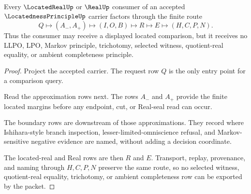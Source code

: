 \begin{theorem}
\label{thm:locatedness-principle-real-boundary}
Every $\LocatedRealUp$ or $\RealUp$ consumer of an accepted $\LocatednessPrincipleUp$ carrier factors through the finite route
$$
Q\longmapsto(A_-,A_+)\longmapsto(I,O,B)\longmapsto R\longmapsto E\longmapsto(H,C,P,N).
$$
Thus the consumer may receive a displayed located comparison, but it receives no LLPO, LPO, Markov principle, trichotomy, selected witness, quotient-real equality, or ambient completeness principle.
\end{theorem}
\begin{proof}
Project the accepted carrier. The request row $Q$ is the only entry point for a comparison query.

Read the approximation rows next. The rows $A_-$ and $A_+$ provide the finite located margins before any endpoint, cut, or Real-seal read can occur.

The boundary rows are downstream of those approximations. They record where Ishihara-style branch inspection, lesser-limited-omniscience refusal, and Markov-sensitive negative evidence are named, without adding a decision coordinate.

The located-real and Real rows are then $R$ and $E$. Transport, replay, provenance, and naming through $H,C,P,N$ preserve the same route, so no selected witness, quotient-real equality, trichotomy, or ambient completeness row can be exported by the packet.
\end{proof}




